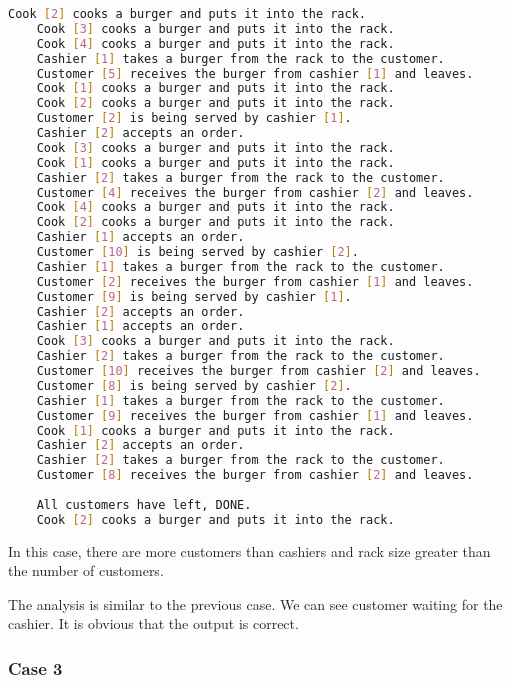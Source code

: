 \begin{lstlisting}[language=bash]
    Cook [2] cooks a burger and puts it into the rack.
    Cook [3] cooks a burger and puts it into the rack.
    Cook [4] cooks a burger and puts it into the rack.
    Cashier [1] takes a burger from the rack to the customer.
    Customer [5] receives the burger from cashier [1] and leaves.
    Cook [1] cooks a burger and puts it into the rack.
    Cook [2] cooks a burger and puts it into the rack.
    Customer [2] is being served by cashier [1].
    Cashier [2] accepts an order.
    Cook [3] cooks a burger and puts it into the rack.
    Cook [1] cooks a burger and puts it into the rack.
    Cashier [2] takes a burger from the rack to the customer.
    Customer [4] receives the burger from cashier [2] and leaves.
    Cook [4] cooks a burger and puts it into the rack.
    Cook [2] cooks a burger and puts it into the rack.
    Cashier [1] accepts an order.
    Customer [10] is being served by cashier [2].
    Cashier [1] takes a burger from the rack to the customer.
    Customer [2] receives the burger from cashier [1] and leaves.
    Customer [9] is being served by cashier [1].
    Cashier [2] accepts an order.
    Cashier [1] accepts an order.
    Cook [3] cooks a burger and puts it into the rack.
    Cashier [2] takes a burger from the rack to the customer.
    Customer [10] receives the burger from cashier [2] and leaves.
    Customer [8] is being served by cashier [2].
    Cashier [1] takes a burger from the rack to the customer.
    Customer [9] receives the burger from cashier [1] and leaves.
    Cook [1] cooks a burger and puts it into the rack.
    Cashier [2] accepts an order.
    Cashier [2] takes a burger from the rack to the customer.
    Customer [8] receives the burger from cashier [2] and leaves.
    
    All customers have left, DONE.
    Cook [2] cooks a burger and puts it into the rack.

\end{lstlisting}

In this case, there are more customers than cashiers and rack size greater than the number of customers.

The analysis is similar to the previous case. We can see customer waiting for the cashier. It is obvious that the output is correct.

\subsubsection{Case 3}

